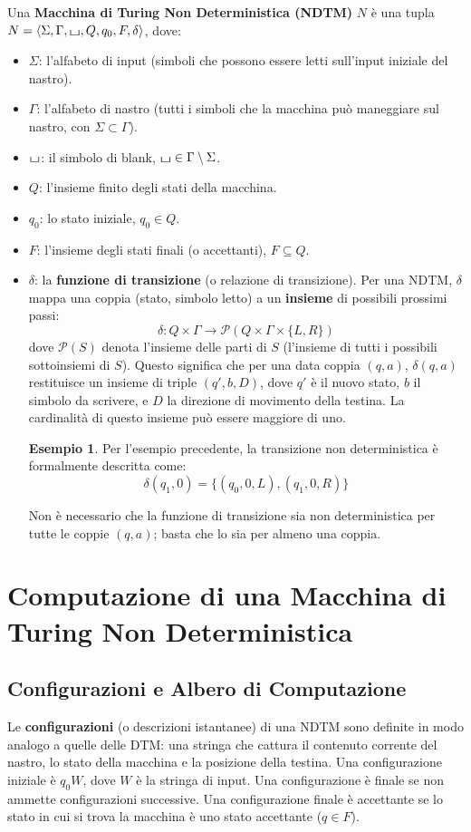 \documentclass[a4paper]{article}
\theoremstyle{definition} %
\newtheorem{example}{Esempio}
\newcommand{\blankS}{\ensuremath{\raisebox{-0.15ex}{\scalebox{1.3}[0.7]{$\sqcup$}}}}
\begin{document}
Una \textbf{Macchina di Turing Non Deterministica (NDTM)} $N$ è una tupla $N = \langle \Sigma, \Gamma, \blankS, Q, q_0, F, \delta \rangle$, dove:
\begin{itemize}
    \item $\Sigma$: l'alfabeto di input (simboli che possono essere letti sull'input iniziale del nastro).
    \item $\Gamma$: l'alfabeto di nastro (tutti i simboli che la macchina può maneggiare sul nastro, con $\Sigma \subset \Gamma$).
    \item $\blankS$: il simbolo di blank, $\blankS \in \Gamma \setminus \Sigma$.
    \item $Q$: l'insieme finito degli stati della macchina.
    \item $q_0$: lo stato iniziale, $q_0 \in Q$.
    \item $F$: l'insieme degli stati finali (o accettanti), $F \subseteq Q$.
    \item $\delta$: la \textbf{funzione di transizione} (o relazione di transizione). Per una NDTM, $\delta$ mappa una coppia (stato, simbolo letto) a un \textbf{insieme} di possibili prossimi passi:
    \[ \delta: Q \times \Gamma \to \mathcal{P}(Q \times \Gamma \times \{L, R\}) \]
    dove $\mathcal{P}(S)$ denota l'insieme delle parti di $S$ (l'insieme di tutti i possibili sottoinsiemi di $S$). Questo significa che per una data coppia $(q, a)$, $\delta(q, a)$ restituisce un insieme di triple $(q', b, D)$, dove $q'$ è il nuovo stato, $b$ il simbolo da scrivere, e $D$ la direzione di movimento della testina. La cardinalità di questo insieme può essere maggiore di uno.

    \begin{example}
    Per l'esempio precedente, la transizione non deterministica è formalmente descritta come:
    \[ \delta(q_1, 0) = \{ (q_0, 0, L), (q_1, 0, R) \} \]
    \end{example}
    Non è necessario che la funzione di transizione sia non deterministica per tutte le coppie $(q,a)$; basta che lo sia per almeno una coppia.
\end{itemize}

\section{Computazione di una Macchina di Turing Non Deterministica}

\subsection{Configurazioni e Albero di Computazione}
Le \textbf{configurazioni} (o descrizioni istantanee) di una NDTM sono definite in modo analogo a quelle delle DTM: una stringa che cattura il contenuto corrente del nastro, lo stato della macchina e la posizione della testina.
Una configurazione iniziale è $q_0W$, dove $W$ è la stringa di input.
Una configurazione è finale se non ammette configurazioni successive. Una configurazione finale è accettante se lo stato in cui si trova la macchina è uno stato accettante ($q \in F$).
\end{document}
